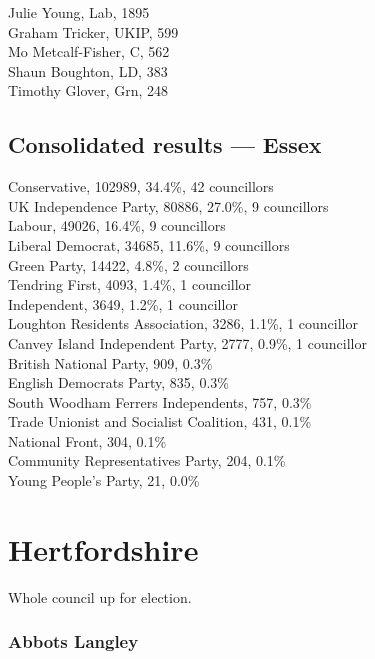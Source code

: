 \documentclass[a4paper,openany,10pt]{book}
\begin{document}


Julie Young, Lab, 1895\\
Graham Tricker, UKIP, 599\\
Mo Metcalf-Fisher, C, 562\\
Shaun Boughton, LD, 383\\
Timothy Glover, Grn, 248\\




\subsection*{Consolidated results --- Essex}
Conservative, 102989, 34.4\%, 42 councillors\\
UK Independence Party, 80886, 27.0\%, 9 councillors\\
Labour, 49026, 16.4\%, 9 councillors\\
Liberal Democrat, 34685, 11.6\%, 9 councillors\\
Green Party, 14422, 4.8\%, 2 councillors\\
Tendring First, 4093, 1.4\%, 1 councillor\\
Independent, 3649, 1.2\%, 1 councillor\\
Loughton Residents Association, 3286, 1.1\%, 1 councillor\\
Canvey Island Independent Party, 2777, 0.9\%, 1 councillor\\
British National Party, 909, 0.3\% \\
English Democrats Party, 835, 0.3\% \\
South Woodham Ferrers Independents, 757, 0.3\% \\
Trade Unionist and Socialist Coalition, 431, 0.1\% \\
National Front, 304, 0.1\% \\
Community Representatives Party, 204, 0.1\% \\
Young People's Party, 21, 0.0\% \\


\vfill

\section{Hertfordshire}

Whole council up for election.



\subsubsection*{Abbots Langley}
\end{document}
